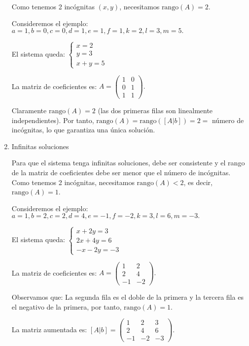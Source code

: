 \begin{prob}
\begin{enumerate}[$a)$]
\begin{myproof}
Como tenemos 2 incógnitas $(x, y)$, necesitamos $\text{rango}(A) = 2$.

Consideremos el ejemplo: $a = 1, b = 0, c = 0, d = 1, e = 1, f = 1, k = 2, l = 3, m = 5.$

El sistema queda: $\left\lbrace \begin{array}{c}
x = 2\\
y = 3\\
x + y = 5
\end{array} \right.$

La matriz de coeficientes es: $A = \begin{pmatrix}
1 & 0 \\
0 & 1 \\
1 & 1
\end{pmatrix}.$

Claramente $\text{rango}(A) = 2$ (las dos primeras filas son linealmente independientes). Por tanto, $\text{rango}(A) = \text{rango}([A|b]) = 2 = $ número de incógnitas, lo que garantiza una única solución.
\end{myproof}

\item Infinitas soluciones 
\begin{myproof} 
Para que el sistema tenga infinitas soluciones, debe ser consistente y el rango de la matriz de coeficientes debe ser menor que el número de incógnitas. Como tenemos 2 incógnitas, necesitamos $\text{rango}(A) < 2$, es decir, $\text{rango}(A) = 1$.

Consideremos el ejemplo: $a = 1, b = 2, c = 2, d = 4, e = -1, f = -2, k = 3, l = 6, m = -3.$

El sistema queda: $\left\lbrace \begin{array}{c}
x + 2y = 3\\
2x + 4y = 6\\
-x - 2y = -3
\end{array} \right.$

La matriz de coeficientes es: $A = \begin{pmatrix}
1 & 2 \\
2 & 4 \\
-1 & -2
\end{pmatrix}.$

Observamos que: La segunda fila es el doble de la primera y la tercera fila es el negativo de la primera, por tanto, $\text{rango}(A) = 1$.

La matriz aumentada es: $[A|b] = \begin{pmatrix}
1 & 2 & 3 \\
2 & 4 & 6 \\
-1 & -2 & -3
\end{pmatrix}.$


\end{myproof}
\end{enumerate}
\end{prob}
